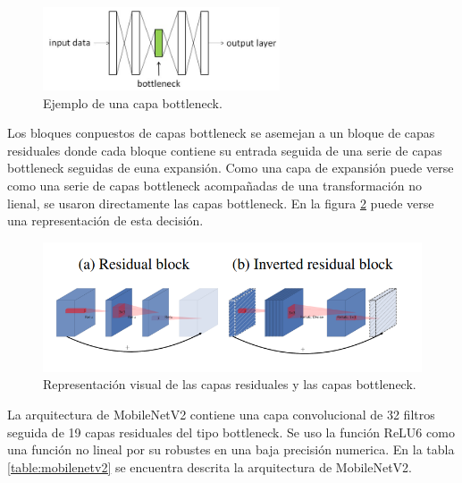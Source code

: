 \begin{figure}[H]
    \centering
    \includegraphics[width=7cm]{Graphics/bottleneck.jpeg}
    \caption{Ejemplo de una capa bottleneck.}
    \label{fig:bottleneck}
\end{figure}


Los bloques conpuestos de capas bottleneck se asemejan a un bloque de capas residuales donde cada bloque contiene su entrada seguida de una serie de capas bottleneck seguidas de euna expansión\cite{Deep_2015}. Como una capa de expansión puede verse como una serie de capas bottleneck acompañadas de una transformación no lienal, se usaron directamente las capas bottleneck. En la figura \ref{fig:residual_block} puede verse una representación de esta decisión.

\begin{figure}[H]
    \centering
    \includegraphics[width=15cm]{Graphics/mobilenetv2.png}
    \caption{Representación visual de las capas residuales y las capas bottleneck\cite{Sandler_2018}.}
    \label{fig:residual_block}
\end{figure}


La arquitectura de MobileNetV2 contiene una capa convolucional de 32 filtros seguida de 19 capas residuales del tipo bottleneck. Se uso la función ReLU6 como una función no lineal por su robustes en una baja precisión numerica\cite{Howard_2017}. En la tabla \ref{table:mobilenetv2} se encuentra descrita la arquitectura de MobileNetV2.

